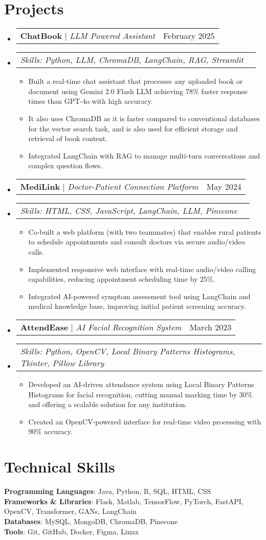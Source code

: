 \documentclass[letterpaper,11pt]{article}
\makeatletter
\newcommand{\resumeItem}[1]{
  \item\small{
    {#1 \vspace{-2pt}}
  }
}
\newcommand{\resumeProjectHeading}[2]{
    \item
    \begin{tabular*}{0.97\textwidth}{l@{\extracolsep{\fill}}r}
      \small#1 & #2 \\
    \end{tabular*}\vspace{-7pt}
}
\newcommand{\projectSkills}[1]{
    \item
    \begin{tabular*}{0.97\textwidth}{l@{\extracolsep{\fill}}r}
      \small\textit{Skills: #1} & \\
    \end{tabular*}\vspace{-7pt}
}
\newcommand{\resumeSubHeadingListStart}{\begin{itemize}[leftmargin=0.15in, label={}]}
\newcommand{\resumeSubHeadingListEnd}{\end{itemize}}
\newcommand{\resumeItemListStart}{\begin{itemize}}
\newcommand{\resumeItemListEnd}{\end{itemize}\vspace{-5pt}}
\makeatother
\begin{document}
\section{Projects}
    \resumeSubHeadingListStart
      \resumeProjectHeading
          {\textbf{ChatBook} $|$ \emph{LLM Powered Assistant}}{February 2025}
      \projectSkills{Python, LLM, ChromaDB, LangChain, RAG, Streamlit}
      \resumeItemListStart
        \resumeItem{Built a real-time chat assistant that processes any uploaded book or document using Gemini 2.0 Flash LLM achieving 78\% faster response times than GPT-4o with high accuracy.}
        \resumeItem{It also uses ChromaDB as it is faster compared to conventional databases for the vector search task, and is also used for efficient storage and retrieval of book content.}
        \resumeItem{Integrated LangChain with RAG to manage multi-turn conversations and complex question flows.}
      \resumeItemListEnd
      \resumeProjectHeading
          {\textbf{MediLink} $|$ \emph{Doctor-Patient Connection Platform}}{May 2024}
      \projectSkills{HTML, CSS, JavaScript, LangChain, LLM, Pinecone}
      \resumeItemListStart
        \resumeItem{Co-built a web platform (with two teammates) that enables rural patients to schedule appointments and consult doctors via secure audio/video calls.}
        \resumeItem{Implemented responsive web interface with real-time audio/video calling capabilities, reducing appointment scheduling time by 25\%.}
        \resumeItem{Integrated AI-powered symptom assessment tool using LangChain and medical knowledge base, improving initial patient screening accuracy.}
      \resumeItemListEnd
      \resumeProjectHeading
          {\textbf{AttendEase} $|$ \emph{AI Facial Recognition System}}{March 2023}
      \projectSkills{Python, OpenCV, Local Binary Patterns Histograms, Tkinter, Pillow Library}
      \resumeItemListStart
        \resumeItem{Developed an AI-driven attendance system using Local Binary Patterns Histograms for facial recognition, cutting manual marking time by 30\% and offering a scalable solution for any institution.}
        \resumeItem{Created an OpenCV-powered interface for real-time video processing with 90\% accuracy.}
      \resumeItemListEnd
    \resumeSubHeadingListEnd

\section{Technical Skills}
 \begin{itemize}[leftmargin=0.15in, label={}]
    \small{\item{
     \textbf{Programming Languages}{: Java, Python, R, SQL, HTML, CSS} \\
     \textbf{Frameworks \& Libraries}{: Flask, Matlab, TensorFlow, PyTorch, FastAPI, OpenCV, Transformer, GANs, LangChain } \\
     \textbf{Databases}{: MySQL, MongoDB, ChromaDB, Pinecone} \\
     \textbf{Tools}{: Git, GitHub, Docker, Figma, Linux}
    }}
 \end{itemize}
\end{document}
